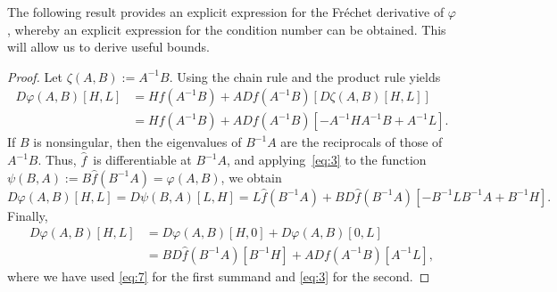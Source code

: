 \documentclass[DIV=14]{scrartcl}
\newcommand{\C}{\ensuremath{\mathbb C}}
\newcommand{\Cnn}{\ensuremath{\C^{n \times n}}}
\theoremstyle{thmstyletwo}
\newtheorem{lemma}[theorem]{Lemma}
\theoremstyle{definition}
\numberwithin{equation}{section}
\newcommand{\wh}{\widehat}
\newcommand{\deq}{\ensuremath{:=}}
\newcommand{\Df}[3]{D#1(#2)[#3]}
\begin{document}
The following result provides an explicit expression for the Fréchet derivative of $\varphi$, whereby an explicit expression for the condition number can be obtained.
This will allow us to derive useful bounds.

\begin{proof} Let $\zeta(A,B)\deq{}A^{-1}B$. Using the chain rule and the product rule yields
\begin{equation}\label{eq:3}
\begin{split}
    \Df{\varphi}{A,B}{H,L}
    & =
    Hf(A^{-1}B)+A\Df{f}{A^{-1}B}{\Df{\zeta}{A,B}{H,L}}\\
    & =
    Hf(A^{-1}B)+A\Df{f}{A^{-1}B}{-A^{-1}HA^{-1}B+A^{-1}L}.
\end{split}
\end{equation}
If $B$ is nonsingular, then the eigenvalues of $B^{-1}A$ are the reciprocals of those of $A^{-1}B$. Thus, $\widehat f$~is differentiable at $B^{-1}A$, and applying~\eqref{eq:3} to the function $\psi(B,A) \deq{} B\wh f(B^{-1}A)=\varphi(A,B)$,
we obtain
\begin{equation}\label{eq:7}
    \Df{\varphi}{A,B}{H,L} = \Df{\psi}{B,A}{L,H} = L\widehat f(B^{-1}A)+
    B\Df{\widehat f}{B^{-1}A}{-B^{-1}LB^{-1}A+B^{-1}H}.
\end{equation}
Finally,
\[
  \begin{aligned}
    \Df{\varphi}{A,B}{H,L}
    &= \Df{\varphi}{A,B}{H,0}+\Df{\varphi}{A,B}{0,L}\\
    &= B\Df{\widehat f}{B^{-1}A}{B^{-1}H} + A\Df{f}{A^{-1}B}{A^{-1}L},
  \end{aligned}
\]
where we have used \eqref{eq:7} for the first summand and \eqref{eq:3} for the second.
\end{proof}
\end{document}
